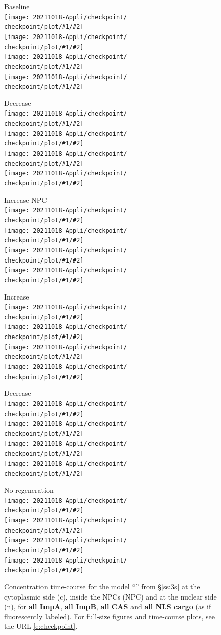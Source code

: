 \documentclass[12pt,notitlepage]{article}
\def\[#1\]{\begin{align}#1\end{align}}
\begin{document}
\clearpage %

\begin{figure}[!h]
	\centering
	
	\vspace{-1\baselineskip}
	
	\newcommand{\fig}[2]{%
		\texttt{[image: 20211018-Appli/checkpoint/\\checkpoint/plot/\#1/\#2]}%
	}
	\newcommand{\figures}[1]{\fig{#1}{All ImpA}\\\fig{#1}{All ImpB}\\\fig{#1}{All CAS}\\\fig{#1}{All NLS}}
	
	\begin{minipage}{0.32\textwidth}
		\centering
		Baseline \\[0.5\baselineskip]
		\figures{a_Baseline}
	\end{minipage}
	\hfill
	\begin{minipage}{0.32\textwidth}
		\centering
		Decrease  \\[0.5\baselineskip]
		\figures{b_LowImpB}
	\end{minipage}
	\hfill
	\begin{minipage}{0.32\textwidth}
		\centering
		Increase NPC \\[0.5\baselineskip]
		\figures{c_MoreNPC}
	\end{minipage}

	\vspace{\baselineskip}

	\begin{minipage}{0.32\textwidth}
		\centering
		Increase  \\[0.5\baselineskip]
		\figures{d_HighImpA}
	\end{minipage}
	\hfill
	\begin{minipage}{0.32\textwidth}
		\centering
		Decrease  \\[0.5\baselineskip]
		\figures{d_LowImpA}
	\end{minipage}
	\hfill
	\begin{minipage}{0.32\textwidth}
		\centering
		No  regeneration \\[0.5\baselineskip]
		\figures{e_NoEnergy}
	\end{minipage}
	
	\vspace{\baselineskip}
		
	\caption{%
		Concentration time-course for the model 
		``'' from \S\ref{ss:3s}
		at the cytoplasmic side (c),
		inside the NPCs (NPC)
		and 
		at the nuclear side (n),
		for 
		\textbf{all ImpA},
		\textbf{all ImpB},
		\textbf{all CAS}
		and
		\textbf{all NLS cargo}
		(as if fluorescently labeled).
		For full-size figures and time-course plots, see the URL \eqref{e:checkpoint}.
	}
	\label{f:app:3s-plot2}
\end{figure}
\end{document}
